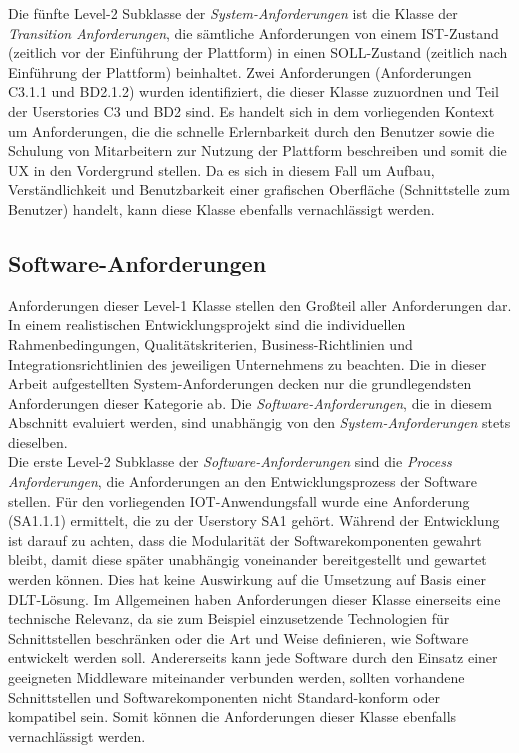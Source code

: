 Die fünfte Level-2 Subklasse der \textit{System-Anforderungen} ist die Klasse der \textit{Transition Anforderungen}, die sämtliche Anforderungen von einem IST-Zustand (zeitlich vor der Einführung der Plattform) in einen SOLL-Zustand (zeitlich nach Einführung der Plattform) beinhaltet. Zwei Anforderungen (Anforderungen C3.1.1 und BD2.1.2) wurden identifiziert, die dieser Klasse zuzuordnen und Teil der Userstories C3 und BD2 sind. Es handelt sich in dem vorliegenden Kontext um Anforderungen, die die schnelle Erlernbarkeit durch den Benutzer sowie die Schulung von Mitarbeitern zur Nutzung der Plattform beschreiben und somit die \ac{UX} in den Vordergrund stellen. Da es sich in diesem Fall um Aufbau, Verständlichkeit und Benutzbarkeit einer grafischen Oberfläche (Schnittstelle zum Benutzer) handelt, kann diese Klasse ebenfalls vernachlässigt werden.\\

\subsection{Software-Anforderungen}
\label{subsec:requirements:evaluation:software}
Anforderungen dieser Level-1 Klasse stellen den Großteil aller Anforderungen dar. In einem realistischen Entwicklungsprojekt sind die individuellen Rahmenbedingungen, Qualitätskriterien, Business-Richtlinien und Integrationsrichtlinien des jeweiligen Unternehmens zu beachten. Die in dieser Arbeit aufgestellten System-Anforderungen decken nur die grundlegendsten Anforderungen dieser Kategorie ab. Die \textit{Software-Anforderungen}, die in diesem Abschnitt evaluiert werden, sind unabhängig von den \textit{System-Anforderungen} stets dieselben.\\

Die erste Level-2 Subklasse der \textit{Software-Anforderungen} sind die \textit{Process Anforderungen}, die Anforderungen an den Entwicklungsprozess der Software stellen. Für den vorliegenden IOT-Anwendungsfall wurde eine Anforderung (SA1.1.1) ermittelt, die zu der Userstory SA1 gehört. Während der Entwicklung ist darauf zu achten, dass die Modularität der Softwarekomponenten gewahrt bleibt, damit diese später unabhängig voneinander bereitgestellt und gewartet werden können. Dies hat keine Auswirkung auf die Umsetzung auf Basis einer \ac{DLT}-Lösung. Im Allgemeinen haben Anforderungen dieser Klasse einerseits eine technische Relevanz, da sie zum Beispiel einzusetzende Technologien für Schnittstellen beschränken oder die Art und Weise definieren, wie Software entwickelt werden soll. Andererseits kann jede Software durch den Einsatz einer geeigneten Middleware miteinander verbunden werden, sollten vorhandene Schnittstellen und Softwarekomponenten nicht Standard-konform oder kompatibel sein. Somit können die Anforderungen dieser Klasse ebenfalls vernachlässigt werden.\\

